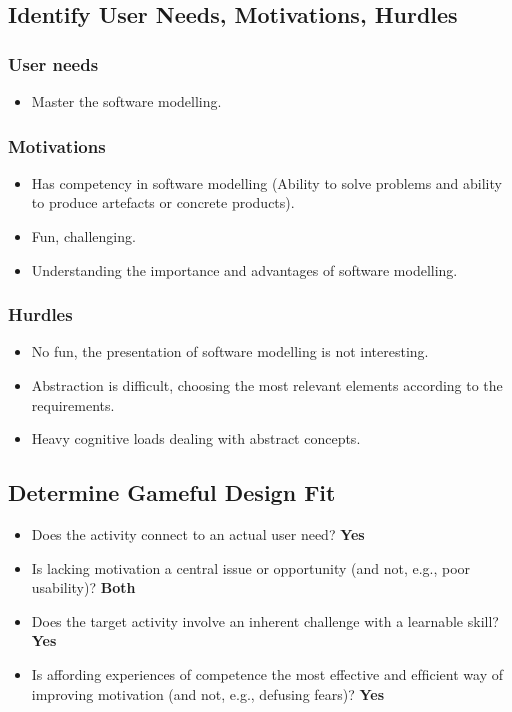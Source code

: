 \documentclass[12pt, a4paper]{report}
\begin{document}
\begin{appendices}
\subsection{Identify User Needs, Motivations, Hurdles}
\subsubsection{User needs}
\begin{itemize}
\item Master the software modelling.
\end{itemize}
\subsubsection{Motivations}
\begin{itemize}
\item Has competency in software modelling (Ability to solve problems and ability to produce artefacts or concrete products).
\item Fun, challenging.
\item Understanding the importance and advantages of software modelling.
\end{itemize}
\subsubsection{Hurdles}
\begin{itemize}
\item No fun, the presentation of software modelling is not interesting.
\item Abstraction is difficult, choosing the most relevant elements according to the requirements.
\item Heavy cognitive loads dealing with abstract concepts.
\end{itemize}

\subsection{Determine Gameful Design Fit}
\begin{itemize}
\item Does the activity connect to an actual user need? \textbf{Yes}
\item Is lacking motivation a central issue or opportunity (and not, e.g., poor usability)? \textbf{Both}
\item Does the target activity involve an inherent challenge with a learnable skill? \textbf{Yes}
\item Is affording experiences of competence the most effective and efﬁcient way of improving motivation (and not, e.g., defusing fears)? \textbf{Yes}
\end{itemize}


\end{appendices}
\end{document}
